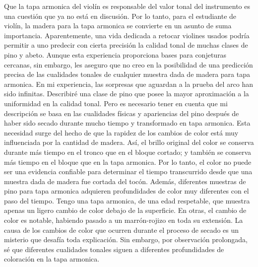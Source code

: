 \documentclass[12pt]{book}
\begin{document}
Que la tapa armonica del violín es responsable del valor tonal del instrumento es una cuestión que ya no está en discusión. Por lo tanto, para el estudiante de violín, la madera para la tapa armonica se convierte en un asunto de suma importancia. Aparentemente, una vida dedicada a retocar violines usados podría permitir a uno predecir con cierta precisión la calidad tonal de muchas clases de pino y abeto. Aunque esta experiencia proporciona bases para conjeturas cercanas, sin embargo, les aseguro que no creo en la posibilidad de una predicción precisa de las cualidades tonales de cualquier muestra dada de madera para tapa armonica. En mi experiencia, las sorpresas que aguardan a la prueba del arco han sido infinitas. Describiré una clase de pino que posee la mayor aproximación a la uniformidad en la calidad tonal. Pero es necesario tener en cuenta que mi descripción se basa en las cualidades físicas y apariencias del pino después de haber sido secado durante mucho tiempo y transformado en tapa armonica. Esta necesidad surge del hecho de que la rapidez de los cambios de color está muy influenciada por la cantidad de madera. Así, el brillo original del color se conserva durante más tiempo en el tronco que en el bloque cortado; y también se conserva más tiempo en el bloque que en la tapa armonica. Por lo tanto, el color no puede ser una evidencia confiable para determinar el tiempo transcurrido desde que una muestra dada de madera fue cortada del tocón. Además, diferentes muestras de pino para tapa armonica adquieren profundidades de color muy diferentes con el paso del tiempo. Tengo una tapa armonica, de una edad respetable, que muestra apenas un ligero cambio de color debajo de la superficie. En otras, el cambio de color es notable, habiendo pasado a un marrón-rojizo en toda su extensión. La causa de los cambios de color que ocurren durante el proceso de secado es un misterio que desafía toda explicación. Sin embargo, por observación prolongada, sé que diferentes cualidades tonales siguen a diferentes profundidades de coloración en la tapa armonica.
\end{document}
